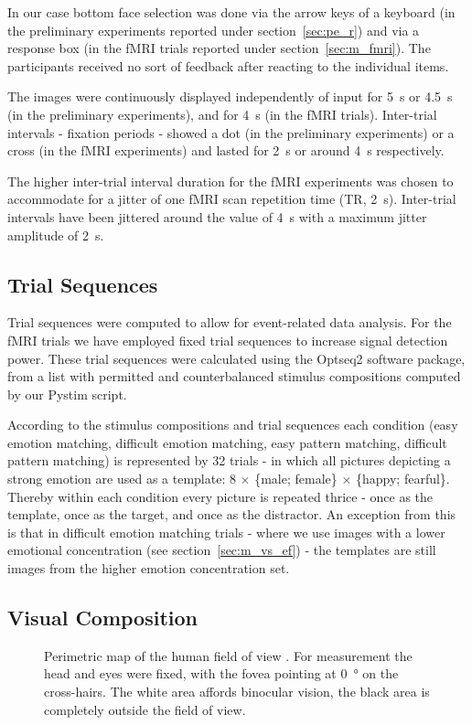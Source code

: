 	In our case bottom face selection was done via the arrow keys of a keyboard (in the preliminary experiments reported under section~\ref{sec:pe_r}) and via a response box (in the fMRI trials reported under section~\ref{sec:m_fmri}).
	The participants received no sort of feedback after reacting to the individual items.
	
	The images were continuously displayed independently of input for \SI{5}{\second} or \SI{4.5}{\second} (in the preliminary experiments), and for \SI{4}{\second} (in the fMRI trials).
	Inter-trial intervals - fixation periods - showed a dot (in the preliminary experiments) or a cross (in the fMRI experiments) and lasted for \SI{2}{\second} or around \SI{4}{\second} respectively.
	
	The higher inter-trial interval duration for the fMRI experiments was chosen to accommodate for a jitter of one fMRI scan repetition time (TR, \SI{2}{\second}).
	Inter-trial intervals have been jittered around the value of \SI{4}{\second} with a maximum jitter amplitude of \SI{2}{\second}.
	\subsection{Trial Sequences}
	    Trial sequences were computed to allow for event-related data analysis.
	    For the fMRI trials we have employed fixed trial sequences to increase signal detection power.
	    These trial sequences were calculated using the Optseq2 \citep{optseq} software package, from a list with permitted and counterbalanced stimulus compositions computed by our Pystim \citep{pystim} script.
	    
	    According to the stimulus compositions and trial sequences each condition (easy emotion matching, difficult emotion matching, easy pattern matching, difficult pattern matching) is represented by 32 trials - in which all pictures depicting a strong emotion are used as a template: 8 $\times$ \{male; female\} $\times$ \{happy; fearful\}.
	    Thereby within each condition every picture is repeated thrice - once as the template, once as the target, and once as the distractor.
	    An exception from this is that in difficult emotion matching trials - where we use images with a lower emotional concentration (see section~\ref{sec:m_vs_ef}) - the templates are still images from the higher emotion concentration set.
	\subsection{Visual Composition}	
	    \begin{wrapfigure}{r}{0.45\textwidth}
		\centering
		\vspace{-1.0cm}
		\caption{Perimetric map of the human field of view \citep{Ruch1960}.
		For measurement the head and eyes were fixed, with the fovea pointing at \SI{0}{\degree} on the cross-hairs.
		The white area affords binocular vision, the black area is completely outside the field of view.}
		\label{fig:m_b_1}
		\vspace{-1.0cm}
	    \end{wrapfigure}
	    
